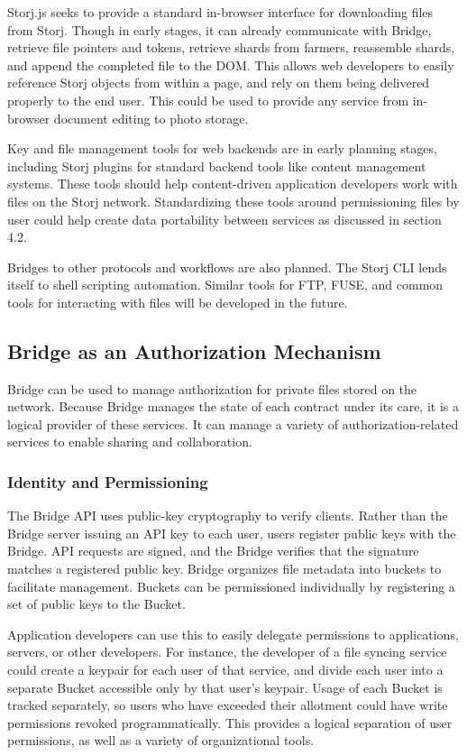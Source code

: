 \documentclass[a4paper,10pt]{article}
\begin{document}
Storj.js\cite{28} seeks to provide a standard in-browser interface for downloading files from Storj. Though in early stages, it can already communicate with Bridge, retrieve file pointers and tokens, retrieve shards from farmers, reassemble shards, and append the completed file to the DOM. This allows web developers to easily reference Storj objects from within a page, and rely on them being delivered properly to the end user. This could be used to provide any service from in-browser document editing to photo storage.

Key and file management tools for web backends are in early planning stages, including Storj plugins for standard backend tools like content management systems. These tools should help content-driven application developers work with files on the Storj network. Standardizing these tools around permissioning files by user could help create data portability between services as discussed in section 4.2.

Bridges to other protocols and workflows are also planned. The Storj CLI lends itself to shell scripting automation. Similar tools for FTP, FUSE, and common tools for interacting with files will be developed in the future.

\subsection{Bridge as an Authorization Mechanism}
Bridge can be used to manage authorization for private files stored on the network. Because Bridge manages the state of each contract under its care, it is a logical provider of these services. It can manage a variety of authorization-related services to enable sharing and collaboration.

\subsubsection{Identity and Permissioning}
The Bridge API uses public-key cryptography to verify clients. Rather than the Bridge server issuing an API key to each user, users register public keys with the Bridge. API requests are signed, and the Bridge verifies that the signature matches a registered public key. Bridge organizes file metadata into buckets to facilitate management. Buckets can be permissioned individually by registering a set of public keys to the Bucket.

Application developers can use this to easily delegate permissions to applications, servers, or  other developers. For instance, the developer of a file syncing service could create a keypair for each user of that service, and divide each user into a separate Bucket accessible only by that user’s keypair. Usage of each Bucket is tracked separately, so users who have exceeded their allotment could have write permissions revoked programmatically. This provides a logical separation of user permissions, as well as a variety of organizational tools.
\end{document}
